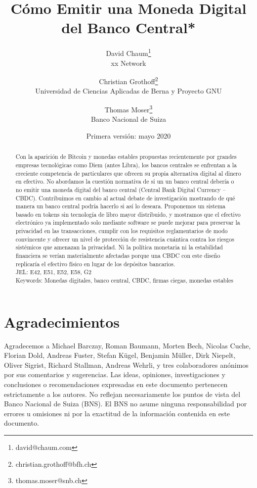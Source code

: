 \documentclass[10pt,spanish]{article}
\begin{document}
\title{Cómo Emitir una Moneda Digital del Banco Central*}
\author{David Chaum\footnote{david@chaum.com} \\
  xx Network \and
  Christian Grothoff\footnote{christian.grothoff@bfh.ch} \\
  Universidad de Ciencias Aplicadas de Berna y Proyecto GNU \and
  Thomas Moser\footnote{thomas.moser@snb.ch}\\
  Banco Nacional de Suiza}
\date{Primera versión: mayo 2020}
\maketitle

\renewcommand{\abstractname}{Resumen}
\renewcommand{\refname}{Referencias}

\begin{abstract}%
Con la aparición de Bitcoin y monedas estables propuestas recientemente
por grandes empresas tecnológicas como Diem (antes Libra), los bancos
centrales se enfrentan a la creciente competencia de particulares que
ofrecen su propia alternativa digital al dinero en efectivo. No
abordamos la cuestión normativa de si un un banco central debería o no
emitir una moneda digital del banco central (Central Bank Digital
Currency -- CBDC). Contribuimos en cambio al actual debate de
investigación mostrando de qué manera un banco central podría hacerlo si
así lo deseara. Proponemos un sistema basado en tokens sin tecnología de
libro mayor distribuido, y mostramos que el efectivo electrónico ya
implementado solo mediante software se puede mejorar para preservar la
privacidad en las transacciones, cumplir con los requisitos
reglamentarios de modo convincente y ofrecer un nivel de protección de
resistencia cuántica contra los riesgos sistémicos que amenazan la
privacidad. Ni la política monetaria ni la estabilidad financiera se
verían materialmente afectadas porque una CBDC con este diseño
replicaría el efectivo físico en lugar de los depósitos bancarios. \\
JEL: E42, E51, E52, E58, G2
\\
Keywords: Monedas digitales, banco central, CBDC, firmas ciegas, monedas
estables
\end{abstract}
\vspace{20pt}
\vspace{20pt}


\section*{Agradecimientos}
Agradecemos a Michael Barczay, Roman Baumann, Morten Bech, Nicolas Cuche,
Florian Dold, Andreas Fuster, Stefan Kügel, Benjamin Müller, Dirk Niepelt,
Oliver Sigrist, Richard Stallman, Andreas Wehrli, y tres colaboradores
anónimos por sus comentarios y sugerencias. Las ideas, opiniones,
investigaciones y conclusiones o recomendaciones expresadas en este
documento pertenecen estrictamente a los autores. No reflejan
necesariamente los puntos de vista del Banco Nacional de Suiza (BNS). El
BNS no asume ninguna responsabilidad por errores u omisiones ni por la
exactitud de la información contenida en este documento.
\end{document}

